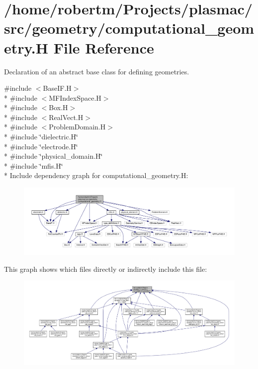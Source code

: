 \hypertarget{computational__geometry_8H}{}\section{/home/robertm/\+Projects/plasmac/src/geometry/computational\+\_\+geometry.H File Reference}
\label{computational__geometry_8H}


Declaration of an abstract base class for defining geometries.  


{\ttfamily \#include $<$Base\+I\+F.\+H$>$}\\*
{\ttfamily \#include $<$M\+F\+Index\+Space.\+H$>$}\\*
{\ttfamily \#include $<$Box.\+H$>$}\\*
{\ttfamily \#include $<$Real\+Vect.\+H$>$}\\*
{\ttfamily \#include $<$Problem\+Domain.\+H$>$}\\*
{\ttfamily \#include \char`\"{}dielectric.\+H\char`\"{}}\\*
{\ttfamily \#include \char`\"{}electrode.\+H\char`\"{}}\\*
{\ttfamily \#include \char`\"{}physical\+\_\+domain.\+H\char`\"{}}\\*
{\ttfamily \#include \char`\"{}mfis.\+H\char`\"{}}\\*
Include dependency graph for computational\+\_\+geometry.\+H\+:\nopagebreak
\begin{figure}[H]
\begin{center}
\leavevmode
\includegraphics[width=350pt]{computational__geometry_8H__incl}
\end{center}
\end{figure}
This graph shows which files directly or indirectly include this file\+:\nopagebreak
\begin{figure}[H]
\begin{center}
\leavevmode
\includegraphics[width=350pt]{computational__geometry_8H__dep__incl}
\end{center}
\end{figure}
